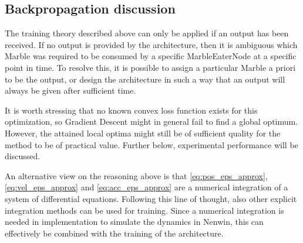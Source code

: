 

\subsection{Backpropagation discussion}
The training theory described above can only be applied if an output has been received. If no output is provided by the architecture, then it is ambiguous which Marble was required to be consumed by a specific MarbleEaterNode at a specific point in time. To resolve this, it is possible to assign a particular Marble a priori to be the output, or design the architecture in such a way that an output will always be given after sufficient time.

It is worth stressing that no known convex loss function exists for this optimization, so Gradient Descent might in general fail to find a global optimum. However, the attained local optima might still be of sufficient quality for the method to be of practical value. Further below, experimental performance will be discussed.


An alternative view on the reasoning above is that \eqref{eq:pos_eps_approx}, \eqref{eq:vel_eps_approx} and \eqref{eq:acc_eps_approx} are a numerical integration of a system of differential equations. Following this line of thought, also other explicit integration methods can be used for training. Since a numerical integration is needed in implementation to simulate the dynamics in Nenwin, this can effectively be combined with the training of the architecture.